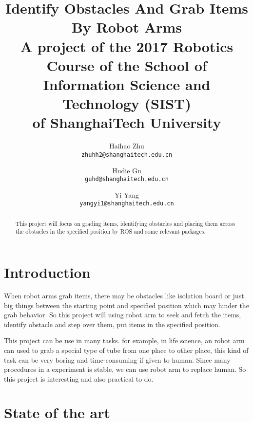 \documentclass[10pt,twocolumn,letterpaper]{article}
\begin{document}
\title{
Identify Obstacles And Grab Items By Robot Arms \\
\bigskip
\large A project of the	2017 Robotics Course of	the	School of \\
Information Science and Technology (SIST) \\
of ShanghaiTech University}


\author{Haihao Zhu\\
{\tt\small zhuhh2@shanghaitech.edu.cn}
\and
Hudie Gu\\
{\tt\small guhd@shanghaitech.edu.cn}
\and
Yi Yang\\
{\tt\small yangyi1@shanghaitech.edu.cn}
}
\maketitle

\begin{abstract}
   This project will focus on grading items, identifying obstacles and placing them across the obstacles in the specified position by ROS and some relevant packages.
\end{abstract}

\section{Introduction}

When robot arms grab items, there may be obstacles like isolation board or just big things between the starting point and specified position which may hinder the grab behavior. So this project will using robot arm to seek and fetch the items, identify obstacle and step over them, put items in the specified position.

This project can be use in many tasks. for example, in life science, an robot arm can used to grab a special type of tube from one place to other place, this kind of task can be very boring and time-consuming if given to human. Since many procedures in a experiment is stable, we can use robot arm to replace human. So this project is interesting and also practical to do.

\section{State of the art}
\end{document}
